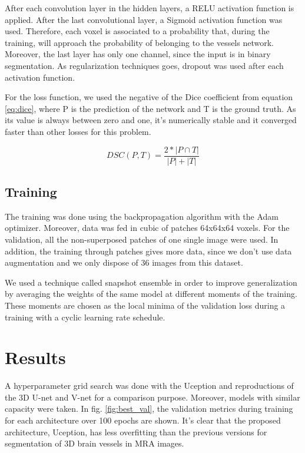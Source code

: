 \documentclass{article}
\begin{document}
After each convolution layer in the hidden layers, a RELU activation function is applied. After the last convolutional layer, a Sigmoid  activation function was used. Therefore, each voxel is associated to a probability that, during the training, will approach the probability of belonging to the vessels network. Moreover, the last layer has only one channel, since the input is in binary segmentation. As regularization techniques goes, dropout was used after each activation function.

For the loss function, we used the negative of the Dice coefficient from equation \ref{eq:dice}, where \textsc{P} is the prediction of the network and \textsc{T} is the ground truth. As its value is always between zero and one, it's numerically stable and it converged faster than other losses for this problem.

\begin{equation}
\label{eq:dice}
DSC(P,T) = \frac{2*|P \cap T|}{ |P|+|T|}
\end{equation}

\subsection{Training}
The training was done using the backpropagation algorithm with the Adam optimizer. Moreover, data was fed in cubic of patches 64x64x64 voxels. For the validation, all the non-superposed patches of one single image were used. In addition, the training through patches gives more data, since we don't use data augmentation and we only dispose of 36 images from this dataset.

We used a technique called snapshot ensemble \cite{Huang2017} in order to improve generalization by averaging the weights of the same model at different moments of the training. These moments are chosen as the local minima of the validation loss during a training with a cyclic learning rate schedule.

\section{Results}

A hyperparameter grid search was done with the Uception and reproductions of the 3D U-net and V-net for a comparison purpose. Moreover, models with similar capacity were taken. In fig. \ref{fig:best_val}, the validation metrics during training for each architecture over 100 epochs are shown. It's clear that the proposed architecture, Uception, has less overfitting than the previous versions for segmentation of 3D brain vessels in MRA images.
\end{document}
